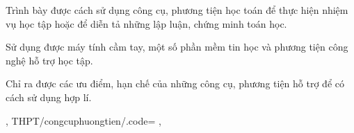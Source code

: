 {{{            \item Trình bày được cách sử dụng công cụ, phương tiện học toán để thực hiện nhiệm vụ học tập hoặc để diễn tả những lập luận, chứng minh toán học.
            \item Sử dụng được máy tính cầm tay, một số phần mềm tin học và phương tiện công nghệ hỗ trợ học tập.
            \item  Chỉ ra được các ưu điểm, hạn chế của những công cụ, phương tiện hỗ trợ để có cách sử dụng hợp lí.
        }
    },
    THPT/congcuphuongtien/.code={
        \def\nangluctoanhocTieuDe{%
            \item[] \textit{Năng lực sử dụng công cụ, phương tiện hoc toán:}
        }
        \def\nangluctoanhocNoiDung{%
            \item Nhận biết được tác dụng, quy cách sử dụng, cách thức bảo quản các công cụ, phương tiện học toán (bảng tổng kết về các dạng hàm số, mô hình góc và cung lượng giác, mô hình các hình khối, bộ dụng cụ tạo mặt tròn xoay,...).
            \item Sử dụng được máy tính cầm tay, phần mềm, phương tiện công nghệ, nguồn tài nguyên trên mạng Internet để giải quyết một số vấn đề toán học.
            \item Đánh giá được cách thức sử dụng các công cụ, phương tiện học toán trong tìm tòi, khám phá và giải quyết vấn đề toán học.
        }
    },
}
